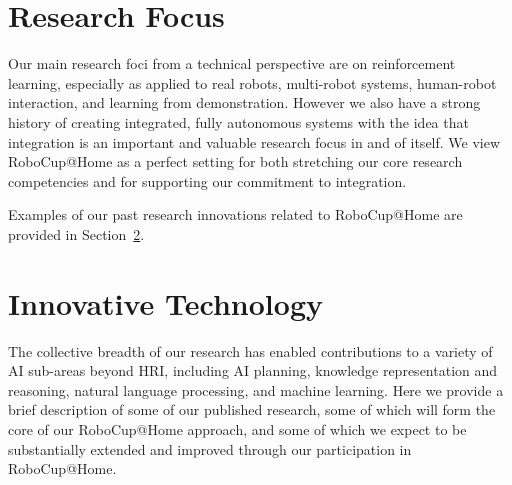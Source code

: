 \documentclass[runningheads,a4paper]{llncs}
\begin{document}

\section{Research Focus}

Our main research foci from a technical perspective are on
reinforcement learning, especially as applied to real robots,
multi-robot systems, human-robot interaction, and learning from
demonstration.  However we also have a strong history of creating
integrated, fully autonomous systems with the idea that integration is
an important and valuable research focus in and of itself.  We view
RoboCup@Home as a perfect setting for both stretching our core
research competencies and for supporting our commitment to
integration.

Examples of our past research innovations related to RoboCup@Home are
provided in Section~\ref{sec:tech}.

\section{Innovative Technology}
\label{sec:tech}

The collective breadth of our research has enabled contributions to a
variety of AI sub-areas beyond HRI, including AI planning, knowledge
representation and reasoning, natural language processing, and machine
learning.  Here we provide a brief description of some of our
published research, some of which will form the core of our
RoboCup@Home approach, and some of which we expect to be substantially
extended and improved through our participation in RoboCup@Home.
\end{document}
